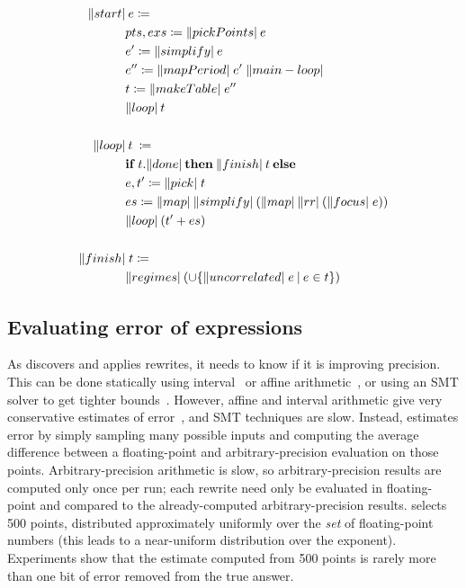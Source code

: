 \documentclass[paper.tex]{subfiles}
\begin{document}
\begin{figure}
\begin{align*}
  \|start| &\:e\coloneqq \\
  & pts, exs \coloneqq \|pickPoints|\:e \\
  & e' \coloneqq \|simplify|\:e \\
  & e'' \coloneqq \|mapPeriod|\;e'\;\|main-loop| \\
  & t \coloneqq \|makeTable|\;e''\\
  & \|loop|\:t\\
  \\
  \|loop| &\:t\:\coloneqq \\
  & \mathbf{if}\:t.\|done|\:\mathbf{then}\:\|finish|\:t\:\mathbf{else} \\
  & e, t' \coloneqq \|pick|\;t \\
  & es \coloneqq \|map|\:\|simplify|\:(\|map|\:\|rr|\:(\|focus|\;e)) \\
  & \|loop|\:(t' + es) \\
  \\
  \|finish| &\;t \coloneqq \\
  & \|regimes|\:(\cup\{\|uncorrelated|\;e \:|\: e \in t \})
\end{align*}

\end{figure}

\subsection{Evaluating error of expressions}

As \casio discovers and applies rewrites,
  it needs to know if it is improving precision.
This can be done statically using interval~\cite{} or affine arithmetic~\cite{},
  or using an SMT solver to get tighter bounds~\cite{}.
However, affine and interval arithmetic give
  very conservative estimates of error~\cite{},
  and SMT techniques are slow.
Instead, \casio estimates error by simply sampling many possible inputs
  and computing the average difference between a floating-point
  and arbitrary-precision evaluation on those points.
Arbitrary-precision arithmetic is slow,
  so arbitrary-precision results are computed only once per run;
  each rewrite need only be evaluated in floating-point
  and compared to the already-computed arbitrary-precision results.
\casio selects 500 points, distributed approximately uniformly
  over the \emph{set} of floating-point numbers
  (this leads to a near-uniform distribution over the exponent).
Experiments show that the estimate computed from 500 points
  is rarely more than one bit of error removed from the true answer.
\end{document}
